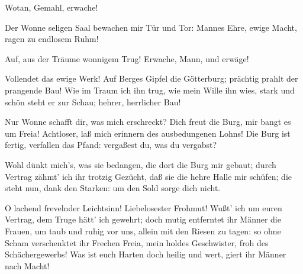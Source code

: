 \begin{drama}
\scene


\Frickaspeaks


Wotan, Gemahl, erwache!
 

\Wotanspeaks


Der Wonne seligen Saal
bewachen mir Tür und Tor:
Mannes Ehre, ewige Macht,
ragen zu endlosem Ruhm!
 

\Frickaspeaks


Auf, aus der Träume wonnigem Trug!
Erwache, Mann, und erwäge!
 

\Wotanspeaks


Vollendet das ewige Werk!
Auf Berges Gipfel die Götterburg;
prächtig prahlt der prangende Bau!
Wie im Traum ich ihn trug,
wie mein Wille ihn wies, stark und schön
steht er zur Schau; hehrer, herrlicher Bau!
 

\Frickaspeaks
Nur Wonne schafft dir, was mich erschreckt?
Dich freut die Burg, mir bangt es um Freia!
Achtloser, laß mich erinnern
des ausbedungenen Lohns!
Die Burg ist fertig, verfallen das Pfand:
vergaßest du, was du vergabst?
 

\Wotanspeaks
Wohl dünkt mich's, was sie bedangen,
die dort die Burg mir gebaut;
durch Vertrag zähmt' ich ihr trotzig Gezücht,
daß sie die hehre Halle mir schüfen;
die steht nun, dank den Starken:
um den Sold sorge dich nicht.
 

\Frickaspeaks
O lachend frevelnder Leichtsinn!
Liebelosester Frohmut!
Wußt' ich um euren Vertrag,
dem Truge hätt' ich gewehrt;
doch mutig entferntet ihr Männer die Frauen,
um taub und ruhig vor uns,
allein mit den Riesen zu tagen:
so ohne Scham verschenktet ihr Frechen
Freia, mein holdes Geschwister,
froh des Schächergewerbs!
Was ist euch Harten doch heilig und wert,
giert ihr Männer nach Macht!
 


\end{drama}
